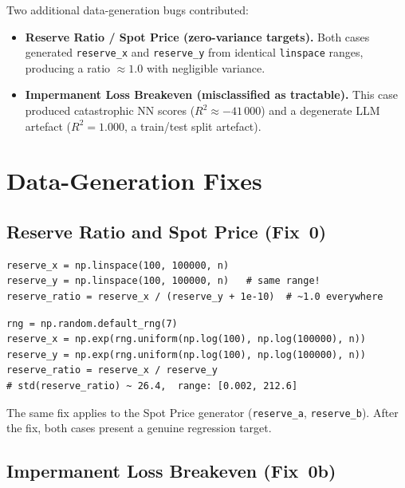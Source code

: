 \documentclass[twoside,11pt]{article}
\begin{document}
Two additional data-generation bugs contributed:

\begin{itemize}[leftmargin=*]
  \item \textbf{Reserve Ratio / Spot Price (zero-variance targets).}
    Both cases generated \texttt{reserve\_x} and \texttt{reserve\_y} from
    identical \texttt{linspace} ranges, producing a ratio $\approx 1.0$ with
    negligible variance.
  \item \textbf{Impermanent Loss Breakeven (misclassified as tractable).}
    This case produced catastrophic NN scores ($R^2 \approx -41\,000$) and a
    degenerate LLM artefact ($R^2 = 1.000$, a train/test split artefact).
\end{itemize}

\section{Data-Generation Fixes}
\label{sec:data_fixes}

\subsection{Reserve Ratio and Spot Price (Fix~0)}

\begin{lstlisting}[caption={Buggy generator — identical linspace ranges.}]
reserve_x = np.linspace(100, 100000, n)
reserve_y = np.linspace(100, 100000, n)   # same range!
reserve_ratio = reserve_x / (reserve_y + 1e-10)  # ~1.0 everywhere
\end{lstlisting}

\begin{lstlisting}[caption={Fixed generator — independent log-uniform sampling (seed=7).}]
rng = np.random.default_rng(7)
reserve_x = np.exp(rng.uniform(np.log(100), np.log(100000), n))
reserve_y = np.exp(rng.uniform(np.log(100), np.log(100000), n))
reserve_ratio = reserve_x / reserve_y
# std(reserve_ratio) ~ 26.4,  range: [0.002, 212.6]
\end{lstlisting}

The same fix applies to the Spot Price generator
(\texttt{reserve\_a}, \texttt{reserve\_b}).  After the fix, both cases present
a genuine regression target.

\subsection{Impermanent Loss Breakeven (Fix~0b)}
\end{document}

